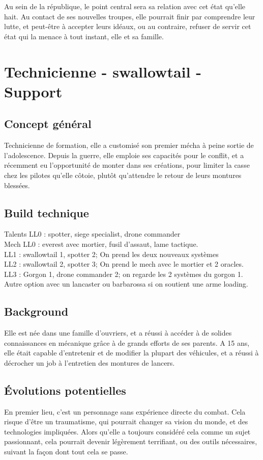 \documentclass[10pt,a4paper]{article}
\begin{document}
Au sein de la république, le point central sera sa relation avec cet état qu'elle hait. Au contact de ses nouvelles troupes, elle pourrait finir par comprendre leur lutte, et peut-être à accepter leurs idéaux, ou au contraire, refuser de servir cet état qui la menace à tout instant, elle et sa famille.
\section{Technicienne - swallowtail - Support}
\subsection{Concept général}
Technicienne de formation, elle a customisé son premier mécha à peine sortie de l'adolescence. Depuis la guerre, elle emploie ses capacités pour le conflit, et a récemment eu l'opportunité de monter dans ses créations, pour limiter la casse chez les pilotes qu'elle côtoie, plutôt qu'attendre le retour de leurs montures blessées.
\subsection{Build technique}
Talents LL0 : spotter, siege specialist, drone commander\\
Mech LL0 : everest avec mortier, fusil d'assaut, lame tactique.\\
LL1 : swallowtail 1, spotter 2; On prend les deux nouveaux systèmes\\
LL2 : swallowtail 2, spotter 3; On prend le mech avec le mortier et 2 oracles.\\
LL3 : Gorgon 1, drone commander 2; on regarde les 2 systèmes du gorgon 1. Autre option avec un lancaster ou barbarossa si on soutient une arme loading.
\subsection{Background}
Elle est née dans une famille d'ouvriers, et a réussi à accéder à de solides connaissances en mécanique grâce à de grands efforts de ses parents. A 15 ans, elle était capable d'entretenir et de modifier la plupart des véhicules, et a réussi à décrocher un job à l'entretien des montures de lancers.
\subsection{Évolutions potentielles}
En premier lieu, c'est un personnage sans expérience directe du combat. Cela risque d'être un traumatisme, qui pourrait changer sa vision du monde, et des technologies impliquées. Alors qu'elle a toujours considéré cela comme un sujet passionnant, cela pourrait devenir légèrement terrifiant, ou des outils nécessaires, suivant la façon dont tout cela se passe.
\end{document}
